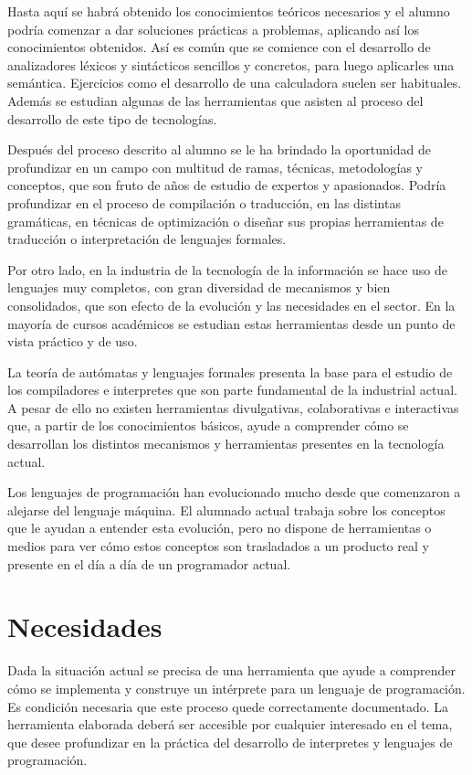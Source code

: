 Hasta aquí se habrá obtenido los conocimientos teóricos necesarios y el alumno podría comenzar a dar soluciones prácticas a problemas, aplicando así los conocimientos obtenidos. Así es
común que se comience con el desarrollo de analizadores léxicos y sintácticos sencillos y concretos, para luego aplicarles una semántica. Ejercicios como el desarrollo de 
una calculadora suelen ser habituales. Además se estudian algunas de las herramientas que asisten al proceso del desarrollo de este tipo de tecnologías.

Después del proceso descrito al alumno se le ha brindado la oportunidad de profundizar en un campo con multitud de ramas, técnicas, metodologías y conceptos, que son fruto de años de 
estudio de expertos y apasionados. Podría profundizar en el proceso de compilación o traducción, en las distintas gramáticas, en técnicas de optimización o diseñar sus propias herramientas 
de traducción o interpretación de lenguajes formales.

Por otro lado, en la industria de la tecnología de la información se hace uso de lenguajes muy completos, con gran diversidad de mecanismos y bien consolidados, que son efecto de la evolución 
y las necesidades en el sector. En la mayoría de cursos académicos se estudian estas herramientas desde un punto de vista práctico y de uso. 

La teoría de autómatas y lenguajes formales presenta la base para el estudio de los compiladores e interpretes que son parte fundamental de la industrial 
actual. A pesar de ello no existen herramientas divulgativas, colaborativas e interactivas que, a partir de los conocimientos básicos, ayude a comprender cómo se desarrollan los distintos 
mecanismos y herramientas presentes en la tecnología actual.

Los lenguajes de programación han evolucionado mucho desde que comenzaron a alejarse del lenguaje máquina. El alumnado actual trabaja sobre los conceptos que le ayudan a entender esta evolución, 
pero no dispone de herramientas o medios para ver cómo estos conceptos son trasladados a un producto real y presente en el día a día de un programador actual. 

\section{Necesidades}
Dada la situación actual se precisa de una herramienta que ayude a comprender cómo se implementa y construye un intérprete para un lenguaje de programación. Es condición necesaria que 
este proceso quede correctamente documentado. La herramienta elaborada deberá ser accesible por cualquier interesado en el tema, que desee profundizar en la práctica del desarrollo
de interpretes y lenguajes de programación. 

